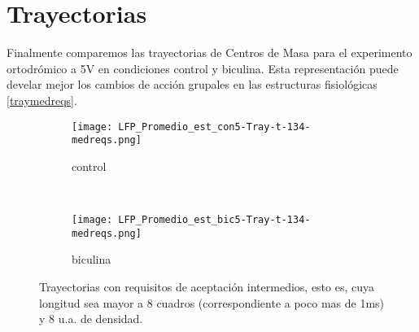 \documentclass{article}
\begin{document}
\section{Trayectorias}

Finalmente comparemos las trayectorias de Centros de Masa para el experimento ortodrómico
a 5V en condiciones control y biculina. Esta representación puede develar mejor los cambios
de acción grupales en las estructuras fisiológicas \ref{traymedreqs}.


\begin{figure}
  \centering
    \begin{subfigure}[b]{0.45\textwidth}
      \texttt{[image: LFP\_Promedio\_est\_con5-Tray-t-134-medreqs.png]}
        \caption{control}
    \end{subfigure}
    ~
    \begin{subfigure}[b]{0.45\textwidth}
       \texttt{[image: LFP\_Promedio\_est\_bic5-Tray-t-134-medreqs.png]}
       \caption{biculina}
     \end{subfigure}
     \caption{Trayectorias con requisitos de aceptación intermedios, esto es,
       cuya longitud sea mayor a 8 cuadros (correspondiente a poco mas de 1ms) y
       8 u.a. de densidad.}
\end{figure}
\end{document}
